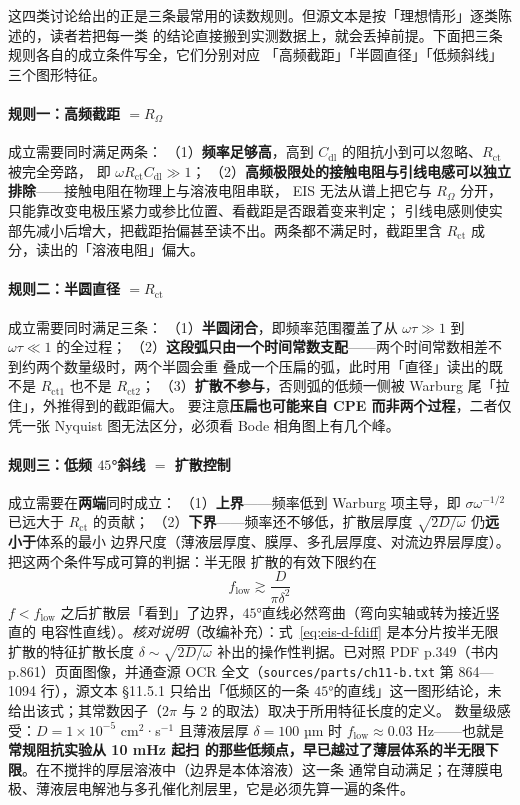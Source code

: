 这四类讨论给出的正是三条最常用的读数规则。但源文本是按「理想情形」逐类陈述的，读者若把每一类
的结论直接搬到实测数据上，就会丢掉前提。下面把三条规则各自的成立条件写全，它们分别对应
「高频截距」「半圆直径」「低频斜线」三个图形特征。

\paragraph{规则一：高频截距 $=R_{\Omega}$} 成立需要同时满足两条：
（1）\textbf{频率足够高}，高到 $C_{\mathrm{dl}}$ 的阻抗小到可以忽略、$R_{\mathrm{ct}}$ 被完全旁路，
即 $\omega R_{\mathrm{ct}}C_{\mathrm{dl}}\gg1$；
（2）\textbf{高频极限处的接触电阻与引线电感可以独立排除}——接触电阻在物理上与溶液电阻串联，
EIS 无法从谱上把它与 $R_{\Omega}$ 分开，只能靠改变电极压紧力或参比位置、看截距是否跟着变来判定；
引线电感则使实部先减小后增大，把截距抬偏甚至读不出。两条都不满足时，截距里含 $R_{\mathrm{ct}}$
成分，读出的「溶液电阻」偏大。

\paragraph{规则二：半圆直径 $=R_{\mathrm{ct}}$} 成立需要同时满足三条：
（1）\textbf{半圆闭合}，即频率范围覆盖了从 $\omega\tau\gg1$ 到 $\omega\tau\ll1$ 的全过程；
（2）\textbf{这段弧只由一个时间常数支配}——两个时间常数相差不到约两个数量级时，两个半圆会重
叠成一个压扁的弧，此时用「直径」读出的既不是 $R_{\mathrm{ct}1}$ 也不是 $R_{\mathrm{ct}2}$；
（3）\textbf{扩散不参与}，否则弧的低频一侧被 Warburg 尾「拉住」，外推得到的截距偏大。
要注意\textbf{压扁也可能来自 CPE 而非两个过程}，二者仅凭一张 Nyquist 图无法区分，必须看 Bode
相角图上有几个峰。

\paragraph{规则三：低频 $45$°斜线 $=$ 扩散控制} 成立需要在\textbf{两端}同时成立：
（1）\textbf{上界}——频率低到 Warburg 项主导，即 $\sigma\omega^{-1/2}$ 已远大于 $R_{\mathrm{ct}}$
的贡献；
（2）\textbf{下界}——频率还不够低，扩散层厚度 $\sqrt{2D/\omega}$ 仍\textbf{远小于}体系的最小
边界尺度（薄液层厚度、膜厚、多孔层厚度、对流边界层厚度）。把这两个条件写成可算的判据：半无限
扩散的有效下限约在
\begin{equation}
f_{\mathrm{low}}\gtrsim\frac{D}{\pi\delta^{2}}
\label{eq:eis-d-fdiff}
\end{equation}
$f<f_{\mathrm{low}}$ 之后扩散层「看到」了边界，$45$°直线必然弯曲（弯向实轴或转为接近竖直的
电容性直线）。\emph{核对说明}（改编补充）：式~\eqref{eq:eis-d-fdiff} 是本分片按半无限扩散的特征扩散长度 $\delta\sim\sqrt{2D/\omega}$ 补出的操作性判据。已对照 PDF p.349（书内 p.861）页面图像，并通查源 OCR 全文（\texttt{sources/parts/ch11-b.txt} 第 864—1094 行），源文本 §11.5.1 只给出「低频区的一条 $45$°的直线」这一图形结论，未给出该式；其常数因子（$2\pi$ 与 $2$ 的取法）取决于所用特征长度的定义。
数量级感受：$D=1\times10^{-5}$ cm$^{2}$·s$^{-1}$ 且薄液层厚 $\delta=100$ µm 时
$f_{\mathrm{low}}\approx0.03$ Hz——也就是\textbf{常规阻抗实验从 10 mHz 起扫
的那些低频点，早已越过了薄层体系的半无限下限}。在不搅拌的厚层溶液中（边界是本体溶液）这一条
通常自动满足；在薄膜电极、薄液层电解池与多孔催化剂层里，它是必须先算一遍的条件。


